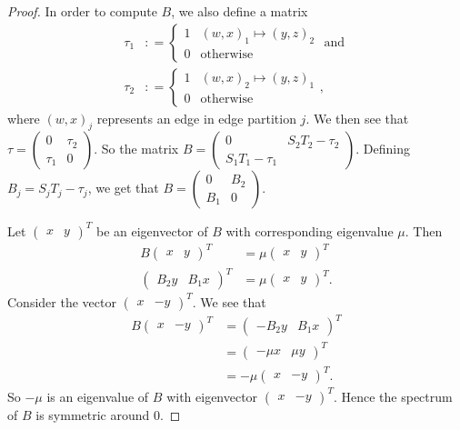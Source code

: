 \documentclass[a4paper]{article}
\begin{document}
\begin{proof}
In order to compute $B$, we also define a matrix
\begin{align}
\tau_1&\colon=\begin{cases}1&(w,x)_1\mapsto(y,z)_2\\0&\text{otherwise}\end{cases}\text{ and }\\
\tau_2&\colon=\begin{cases}1&(w,x)_2\mapsto(y,z)_1\\0&\text{otherwise}\end{cases},
\end{align}
where $(w,x)_j$ represents an edge in edge partition $j$. We then see that $\tau=\begin{pmatrix}0&\tau_2\\\tau_1&0\end{pmatrix}$.
So the matrix $B=\begin{pmatrix}0&S_2T_2-\tau_2\\S_1T_1-\tau_1\end{pmatrix}$.
Defining $B_j=S_jT_j-\tau_j$, we get that $B=\begin{pmatrix}0&B_2\\B_1&0\end{pmatrix}$.

Let $\begin{pmatrix}x&y\end{pmatrix}^T$ be an eigenvector of $B$ with corresponding eigenvalue $\mu$. Then
\begin{align}
B\begin{pmatrix}x&y\end{pmatrix}^T&=\mu\begin{pmatrix}x&y\end{pmatrix}^T\\
\begin{pmatrix}B_2y&B_1x\end{pmatrix}^T&=\mu\begin{pmatrix}x&y\end{pmatrix}^T.
\end{align}
Consider the vector $\begin{pmatrix}x&-y\end{pmatrix}^T$. We see that
\begin{align}
B\begin{pmatrix}x&-y\end{pmatrix}^T&=\begin{pmatrix}-B_2y&B_1x\end{pmatrix}^T\\
&=\begin{pmatrix}-\mu x&\mu y\end{pmatrix}^T\\
&=-\mu\begin{pmatrix}x&-y\end{pmatrix}^T.
\end{align}
So $-\mu$ is an eigenvalue of $B$ with eigenvector $\begin{pmatrix}x&-y\end{pmatrix}^T$. Hence the spectrum of $B$ is symmetric around 0.


\end{proof}
\end{document}
